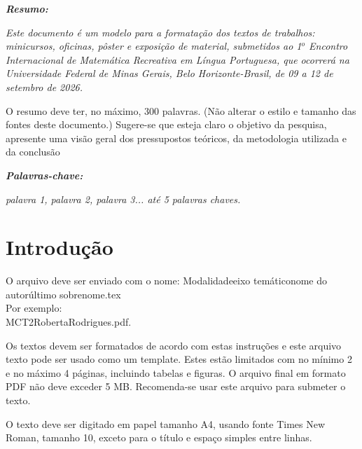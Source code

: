 \documentclass[12pt,oneside,a4paper]{article}
\begin{document}
\noindent \textit{\textbf{Resumo:}}{\it 
  Este documento \'e um modelo para a formata\c{c}\~ao dos textos de trabalhos: minicursos,  oficinas, pôster e exposição de material, submetidos ao 1$^o$ Encontro Internacional de Matemática Recreativa em Língua Portuguesa, que ocorrer\'a na Universidade Federal de Minas Gerais, Belo Horizonte-Brasil, de 09 a 12 de setembro de 2026. 

O resumo deve ter, no m\'aximo, 300 palavras. (N\~ao alterar o estilo e tamanho das fontes deste documento.) Sugere-se que esteja claro o objetivo da pesquisa, apresente uma visão geral dos pressupostos teóricos, da metodologia utilizada e da conclusão
}

\begin{flushleft}
\textit{\textbf{Palavras-chave:}}{\it
palavra 1, palavra 2, palavra 3...  at\'e 5 palavras chaves.

}\end{flushleft}

 






\section{Introdução}
O arquivo deve ser enviado com o nome: \vspace{0.3cm} Modalidade\textunderscore eixo temático\textunderscore nome do autor\textunderscore último sobrenome.tex\\ 
Por exemplo:\vspace{0.3cm}\\
 MC\textunderscore T2\textunderscore Roberta\textunderscore Rodrigues.pdf.

Os textos devem ser formatados de acordo com estas instruções e este arquivo texto pode ser usado como um template. Estes estão limitados com no mínimo 2 e  no máximo 4 páginas, incluindo tabelas e figuras. O arquivo final em formato PDF não deve exceder 5 MB. Recomenda-se usar este arquivo para submeter o texto.

O texto deve ser digitado em papel tamanho A4, usando fonte Times New Roman, tamanho 10, exceto para o título e espaço simples entre linhas.
\end{document}
